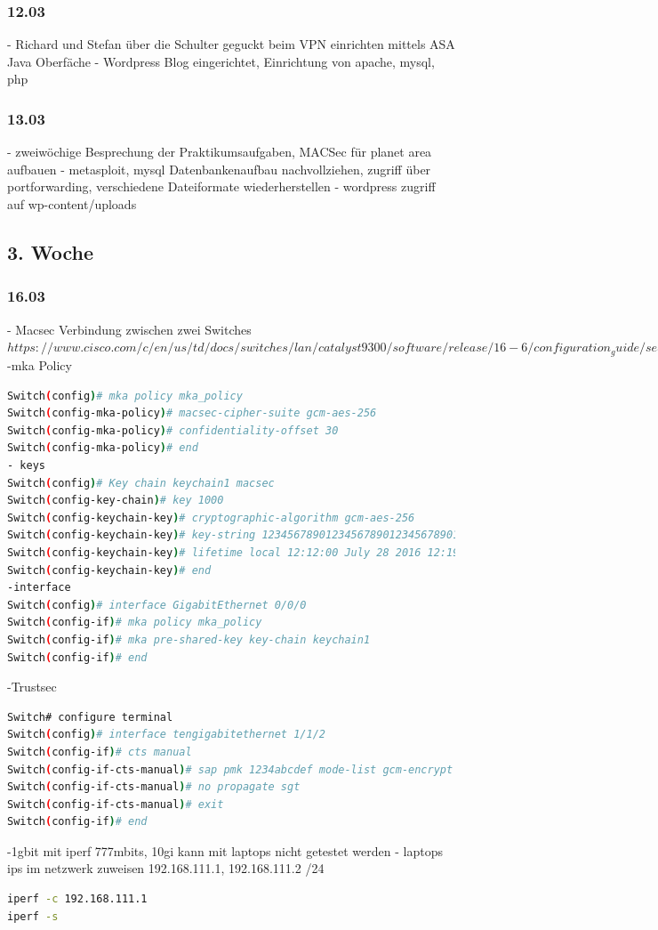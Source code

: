 \documentclass[english,runningheads,a4paper]{llncs}[2018/03/10]
\begin{document}
\subsubsection{12.03}
- Richard und Stefan über die Schulter geguckt beim VPN einrichten mittels ASA Java Oberfäche
- Wordpress Blog eingerichtet, Einrichtung von apache, mysql, php

\subsubsection{13.03}
- zweiwöchige Besprechung der Praktikumsaufgaben, MACSec für planet area aufbauen
- metasploit, mysql Datenbankenaufbau nachvollziehen, zugriff über portforwarding, verschiedene Dateiformate wiederherstellen
- wordpress zugriff auf wp-content/uploads

\subsection{3. Woche}
\subsubsection{16.03}
- Macsec Verbindung zwischen zwei Switches 
 $https://www.cisco.com/c/en/us/td/docs/switches/lan/catalyst9300/software/release/16-6/configuration_guide/sec/b_166_sec_9300_cg/macsec_encryption.html$
-mka Policy
\begin{lstlisting}[language=bash]
Switch(config)# mka policy mka_policy 
Switch(config-mka-policy)# macsec-cipher-suite gcm-aes-256 
Switch(config-mka-policy)# confidentiality-offset 30 
Switch(config-mka-policy)# end 
- keys
Switch(config)# Key chain keychain1 macsec 
Switch(config-key-chain)# key 1000 
Switch(config-keychain-key)# cryptographic-algorithm gcm-aes-256
Switch(config-keychain-key)# key-string 12345678901234567890123456789012 
Switch(config-keychain-key)# lifetime local 12:12:00 July 28 2016 12:19:00 July 28 2016 
Switch(config-keychain-key)# end 
-interface 
Switch(config)# interface GigabitEthernet 0/0/0 
Switch(config-if)# mka policy mka_policy 
Switch(config-if)# mka pre-shared-key key-chain keychain1
Switch(config-if)# end 

\end{lstlisting}
-Trustsec
\begin{lstlisting}[language=bash]
Switch# configure terminal
Switch(config)# interface tengigabitethernet 1/1/2
Switch(config-if)# cts manual
Switch(config-if-cts-manual)# sap pmk 1234abcdef mode-list gcm-encrypt null no-encap
Switch(config-if-cts-manual)# no propagate sgt
Switch(config-if-cts-manual)# exit
Switch(config-if)# end
\end{lstlisting}
-1gbit mit iperf 777mbits, 10gi kann mit laptops nicht getestet werden
- laptops ips im netzwerk zuweisen 192.168.111.1, 192.168.111.2 /24
\begin{lstlisting}[language=bash]
iperf -c 192.168.111.1
iperf -s 
\end{lstlisting}
\end{document}
